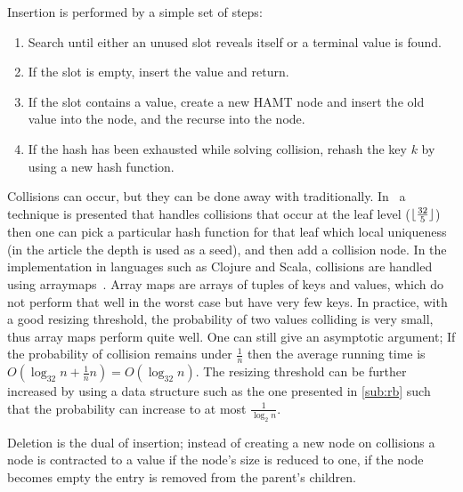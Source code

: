 Insertion is performed by a simple set of steps:
\begin{enumerate}
  \item Search until either an unused slot reveals itself or a terminal value is found.
  \item If the slot is empty, insert the value and return.
  \item If the slot contains a value, create a new HAMT node and insert the old value into the node, and the recurse into the node.
  \item If the hash has been exhausted while solving collision, rehash the key $k$ by using a new hash function.
\end{enumerate}
\begin{remark}
  Collisions can occur, but they can be done away with traditionally.
  In~\cite{bagwell2001ideal} a technique is presented that handles collisions that occur at the leaf level ($\lfloor\frac{32}{5}\rfloor$) then one can pick a particular hash function for that leaf which local uniqueness (in the article the depth is used as a seed), and then add a collision node.
  In the implementation in languages such as Clojure and Scala, collisions are handled using arraymaps~\cite{clojurehamt}.
  Array maps are arrays of tuples of keys and values, which do not perform that well in the worst case but have very few keys.
  In practice, with a good resizing threshold, the probability of two values colliding is very small, thus array maps perform quite well.
  One can still give an asymptotic argument; If the probability of collision remains under $\frac{1}{n}$ then the average running time is $O(\log_{32} n + \frac{1}{n}n) = O(\log_{32}n)$.
  The resizing threshold can be further increased by using a data structure such as the one presented in \autoref{sub:rb} such that the probability can increase to at most $\frac{1}{\log_2 n}$.
\end{remark}

Deletion is the dual of insertion; instead of creating a new node on collisions a node is contracted to a value if the node's size is reduced to one, if the node becomes empty the entry is removed from the parent's children.

